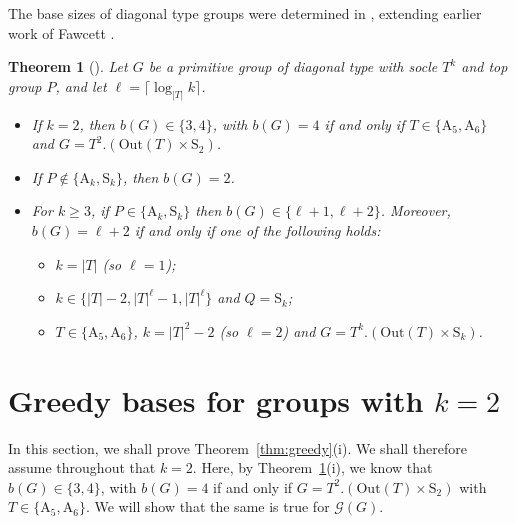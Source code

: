 \documentclass[twoside,a4paper,reqno,11pt]{amsart}
\newcommand{\<}{\langle}
\renewcommand{\>}{\rangle}
\newcommand{\geqs}{\geqslant}
\newcommand{\Out}{\mathrm{Out}}
\newcommand{\Sn}{\mathrm{S}}
\newcommand{\An}{\mathrm{A}}
\newtheorem{thm}{Theorem}[section]
\theoremstyle{definition}
\begin{document}
The base sizes of diagonal type groups were determined in \cite[Theorem 3]{H_diag}, extending earlier work of Fawcett \cite{F_diag}.
\begin{thm}[{\cite[Theorem 3]{H_diag}}]
	\label{t:H_diag}
	Let $G$ be a primitive group of diagonal type with socle $T^k$ and top group $P$, and let $\ell  = \lceil \log_{|T|} k \rceil$.
	\begin{itemize}\addtolength{\itemsep}{0.2\baselineskip}
		\item[{\rm (i)}] If $k = 2$, then $b(G)\in\{3,4\}$, with $b(G) = 4$ if and only if $T\in\{ \An_5, \An_6\}$  and $G = T^2.(\Out(T)\times \Sn_2)$. %
		\item[{\rm (ii)}] If $P\notin \{\An_k, \Sn_k\}$, then $b(G) = 2$.
		\item[{\rm (iii)}] For $k\geqs 3$, if $P\in\{ \An_k, \Sn_k\}$ then $b(G)\in\{\ell+1,\ell+2\}$. Moreover, $b(G) = \ell+2$ if and only if one of the following holds:
		\vspace{1mm}
		\begin{itemize}\addtolength{\itemsep}{0.2\baselineskip}
			\item[{\rm (a)}] $k = |T|$ (so $\ell = 1$);
			\item[{\rm (b)}] $k\in\{|T|-2,|T|^\ell-1,|T|^\ell\}$ and $Q = \Sn_k$;
			\item[{\rm (c)}] $T\in\{ \An_5, \An_6\}$, $k = |T|^2-2$ (so $\ell = 2$) and $G = T^k.(\Out(T) \times  \Sn_k)$. %
		\end{itemize}
	\end{itemize}
\end{thm}



\section{Greedy bases for groups with $k = 2$}\label{sec:k=2}

In this section, we shall prove Theorem~\ref{thm:greedy}(i). We shall therefore assume throughout that $k = 2$. Here, by Theorem~\ref{t:H_diag}(i),  we know that $b(G)\in\{3,4\}$, with $b(G) = 4$ if and only if $G = T^2.(\Out(T)\times  \Sn_2)$ with $T\in\{ \An_5, \An_6\}$. We will show that the same is true for $\mathcal{G}(G)$. %
\end{document}
